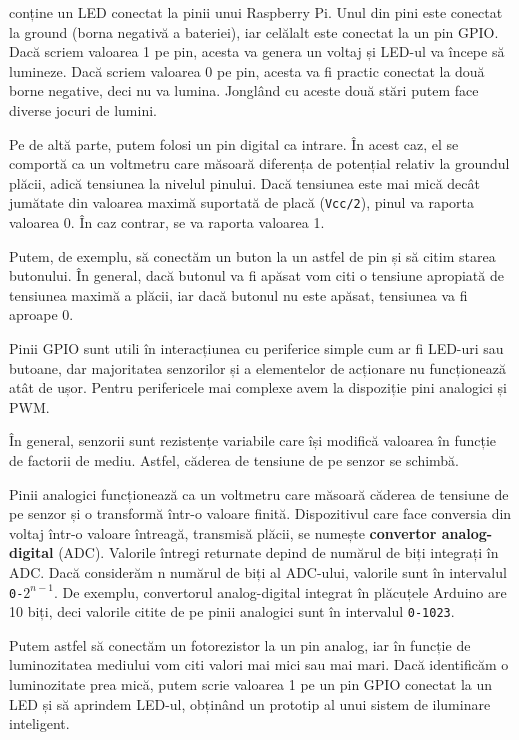  conține un LED conectat la pinii
unui Raspberry Pi. Unul din pini este conectat la ground (borna negativă a
bateriei), iar celălalt este conectat la un pin GPIO. Dacă scriem valoarea 1 pe
pin, acesta va genera un voltaj și LED-ul va începe să lumineze. Dacă scriem
valoarea 0 pe pin, acesta va fi practic conectat la două borne negative, deci nu
va lumina. Jonglând cu aceste două stări putem face diverse jocuri de lumini.

Pe de altă parte, putem folosi un pin digital ca intrare. În acest caz, el se
comportă ca un voltmetru care măsoară diferența de potențial relativ la
groundul plăcii, adică tensiunea la nivelul pinului. Dacă tensiunea este mai
mică decât jumătate din valoarea maximă suportată de placă (\texttt{Vcc/2}), pinul va
raporta valoarea 0. În caz contrar, se va raporta valoarea 1.

Putem, de exemplu, să conectăm un buton la un astfel de pin și să citim starea
butonului. În general, dacă butonul va fi apăsat vom citi o tensiune apropiată
de tensiunea maximă a plăcii, iar dacă butonul nu este apăsat, tensiunea va fi
aproape 0.

Pinii GPIO sunt utili în interacțiunea cu periferice simple cum ar fi LED-uri
sau butoane, dar majoritatea senzorilor și a elementelor de acționare nu
funcționează atât de ușor. Pentru perifericele mai complexe avem la dispoziție
pini analogici și PWM.

În general, senzorii sunt rezistențe variabile care își modifică valoarea în
funcție de factorii de mediu. Astfel, căderea de tensiune de pe senzor se
schimbă.

Pinii analogici funcționează ca un voltmetru care măsoară căderea de tensiune de
pe senzor și o transformă într-o valoare finită. Dispozitivul care face
conversia din voltaj într-o valoare întreagă, transmisă plăcii, se numește
\textbf{convertor analog-digital} (ADC). Valorile întregi returnate depind de numărul de
biți integrați în ADC. Dacă considerăm n numărul de biți al ADC-ului, valorile
sunt în intervalul \texttt{0-$2^{n-1}$}. De exemplu, convertorul analog-digital integrat
în plăcuțele Arduino are 10 biți, deci valorile citite de pe pinii analogici
sunt în intervalul \texttt{0-1023}.

Putem astfel să conectăm un fotorezistor la un pin analog, iar în funcție de
luminozitatea mediului vom citi valori mai mici sau mai mari. Dacă identificăm o
luminozitate prea mică, putem scrie valoarea 1 pe un pin GPIO conectat la un LED
și să aprindem LED-ul, obținând un prototip al unui sistem de iluminare
inteligent.

